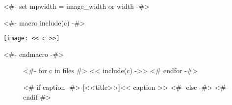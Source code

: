 <#- set mpwidth = image_width or width -#>

<#- macro include(c) -#>
  \begin{minipage}[t]{<< mpwidth >>}
  \texttt{[image: << c >>]}
  \end{minipage}\hspace{5pt}
<#- endmacro -#>

\begin{figure}
  <#- for c in files  #>
    << include(c) ->>
  <# endfor  -#>\hfill
  \hspace{5pt}
  \begin{minipage}[b]{<< width >>}
    <# if caption -#>
    [<<title>>]{<< caption >>}
    <#- else -#>
    <#- endif #>\label{fig:<< id >>}
  \end{minipage}
\end{figure}

